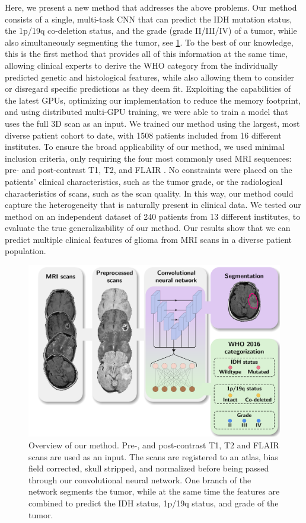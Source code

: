 Here, we present a new method that addresses the above problems.
Our method consists of a single, multi-task \gls{CNN} that can predict the \gls{IDH} mutation status, the 1p/19q co-deletion status, and the grade (grade II/III/IV) of a tumor, while also simultaneously segmenting the tumor, see \cref{fig:pipeline}.
To the best of our knowledge, this is the first method that provides all of this information at the same time, allowing clinical experts to derive the \gls{WHO} category from the individually predicted genetic and histological features, while also allowing them to consider or disregard specific predictions as they deem fit.
Exploiting the capabilities of the latest GPUs, optimizing our implementation to reduce the memory footprint, and using distributed multi-GPU training, we were able to train a model that uses the full 3D scan as an input.
We trained our method using the largest, most diverse patient cohort to date, with 1508 patients included from 16 different institutes.
To ensure the broad applicability of our method, we used minimal inclusion criteria, only requiring the four most commonly used \gls{MRI} sequences: pre- and post-contrast \gls{T1}, \gls{T2}, and \gls{FLAIR} \autocite{thust2018gliomaimaging, fresychlag2018imaging}.
No constraints were placed on the patients' clinical characteristics, such as the tumor grade, or the radiological characteristics of scans, such as the scan quality.
In this way, our method could capture the heterogeneity that is naturally present in clinical data.
We tested our method on an independent dataset of 240 patients from 13 different institutes, to evaluate the true generalizability of our method.
Our results show that we can predict multiple clinical features of glioma from \gls{MRI} scans in a diverse patient population.

\begin{figure}
    \includegraphics[width=\textwidth]{Figures/Pipeline.pdf}
    \caption{Overview of our method.
    Pre-, and post-contrast \gls{T1}, \gls{T2} and \gls{FLAIR} scans are used as an input.
    The scans are registered to an atlas, bias field corrected, skull stripped, and normalized before being passed through our convolutional neural network.
    One branch of the network segments the tumor, while at the same time the features are combined to predict the IDH status, 1p/19q status, and grade of the tumor.
    }\label{fig:pipeline}
    \end{figure}

